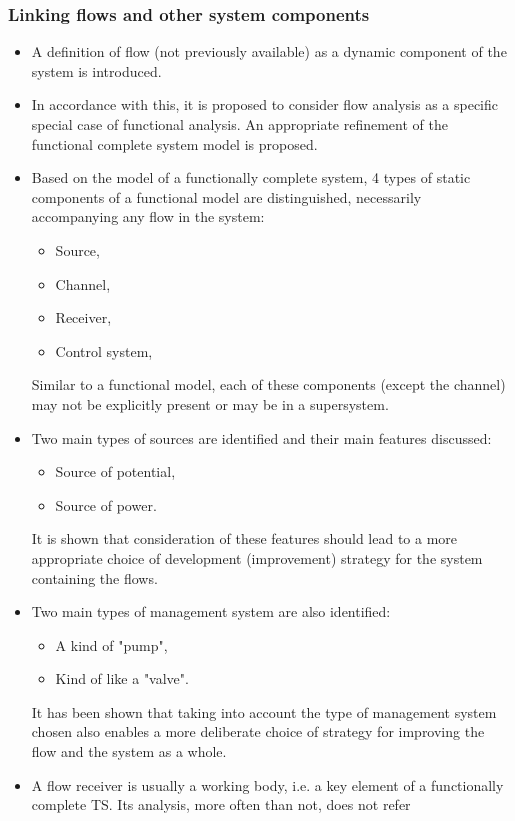 \documentclass[a4paper,11pt]{article}
\begin{document}
\subsubsection{Linking flows and other system components}
\begin{itemize}
\item A definition of flow (not previously available) as a dynamic component
  of the system is introduced.
\item In accordance with this, it is proposed to consider flow analysis as a
  specific special case of functional analysis. An appropriate refinement of
  the functional complete system model is proposed.
\item Based on the model of a functionally complete system, 4 types of static
  components of a functional model are distinguished, necessarily accompanying
  any flow in the system:
  \begin{itemize}
  \item Source,
  \item Channel,
  \item Receiver,
  \item Control system,
  \end{itemize}
  Similar to a functional model, each of these components (except the channel)
  may not be explicitly present or may be in a supersystem.
\item Two main types of sources are identified and their main features
  discussed:
  \begin{itemize}
  \item Source of potential,
  \item Source of power.
  \end{itemize}
  It is shown that consideration of these features should lead to a more
  appropriate choice of development (improvement) strategy for the system
  containing the flows.
\item Two main types of management system are also identified:
  \begin{itemize}
  \item A kind of "pump",
  \item Kind of like a "valve".
  \end{itemize}
  It has been shown that taking into account the type of management system
  chosen also enables a more deliberate choice of strategy for improving the
  flow and the system as a whole.
\item A flow receiver is usually a working body, i.e. a key element of a
  functionally complete TS. Its analysis, more often than not, does not refer

\end{itemize}
\end{document}
